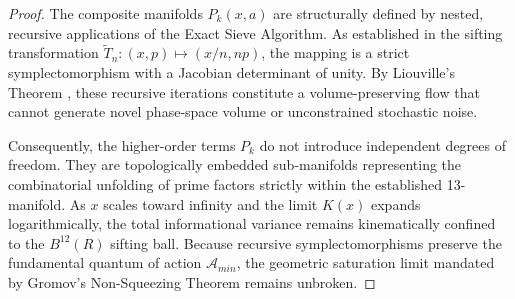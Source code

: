 \documentclass[sn-mathphys-num, pdflatex]{sn-jnl}
\begin{document}
\begin{proof}
The composite manifolds $P_k(x,a)$ are structurally defined by nested, recursive applications of the Exact Sieve Algorithm. As established in the sifting transformation $\tilde{T}_n: (x,p) \mapsto (x/n, np)$, the mapping is a strict symplectomorphism with a Jacobian determinant of unity. By Liouville's Theorem \cite{arnold1989}, these recursive iterations constitute a volume-preserving flow that cannot generate novel phase-space volume or unconstrained stochastic noise.

Consequently, the higher-order terms $P_k$ do not introduce independent degrees of freedom. They are topologically embedded sub-manifolds representing the combinatorial unfolding of prime factors strictly within the established 13-manifold. As $x$ scales toward infinity and the limit $K(x)$ expands logarithmically, the total informational variance remains kinematically confined to the $B^{12}(R)$ sifting ball. Because recursive symplectomorphisms preserve the fundamental quantum of action $\mathcal{A}_{min}$, the geometric saturation limit mandated by Gromov's Non-Squeezing Theorem remains unbroken.


\end{proof}
\end{document}
